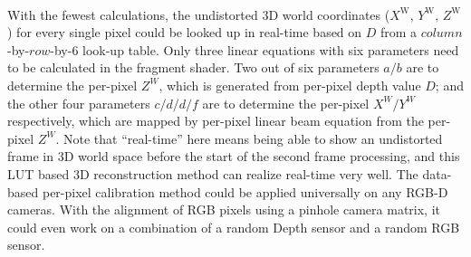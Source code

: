 \\\indent
With the fewest calculations, the undistorted 3D world coordinates (\(X^\text{W}, \, Y^\text{W}, \, Z^\text{W}\)) for every single pixel could be looked up in real-time based on \(D\) from a \(column\)-by-\(row\)-by-\(6\) look-up table. Only three linear equations with six parameters need to be calculated in the fragment shader. Two out of six parameters \(a/b\) are to determine the per-pixel \(Z^W\), which is generated from per-pixel depth value \(D\); and the other four parameters \(c/d/d/f\) are to determine the per-pixel \(X^W/Y^W\) respectively, which are mapped by per-pixel linear beam equation from the per-pixel \(Z^W\). Note that \enquote{real-time} here means being able to show an undistorted frame in 3D world space before the start of the second frame processing, and this LUT based 3D reconstruction method can realize real-time very well. The data-based per-pixel calibration method could be applied universally on any RGB-D cameras. With the alignment of RGB pixels using a pinhole camera matrix, it could even work on a combination of a random Depth sensor and a random RGB sensor.
